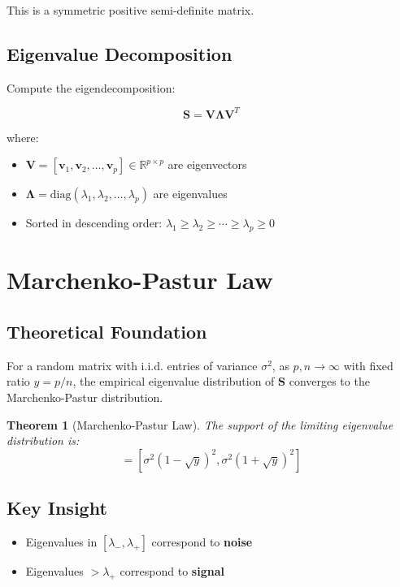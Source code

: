 \documentclass[12pt,a4paper]{article}
\newtheorem{theorem}{Theorem}
\begin{document}
This is a symmetric positive semi-definite matrix.

\subsection{Eigenvalue Decomposition}

Compute the eigendecomposition:

\begin{equation}
\mathbf{S} = \mathbf{V}\mathbf{\Lambda}\mathbf{V}^T
\end{equation}

where:
\begin{itemize}
    \item $\mathbf{V} = [\mathbf{v}_1, \mathbf{v}_2, \ldots, \mathbf{v}_p] \in \mathbb{R}^{p \times p}$ are eigenvectors
    \item $\mathbf{\Lambda} = \text{diag}(\lambda_1, \lambda_2, \ldots, \lambda_p)$ are eigenvalues
    \item Sorted in descending order: $\lambda_1 \geq \lambda_2 \geq \cdots \geq \lambda_p \geq 0$
\end{itemize}

\section{Marchenko-Pastur Law}

\subsection{Theoretical Foundation}

For a random matrix with i.i.d. entries of variance $\sigma^2$, as $p, n \to \infty$ with fixed ratio $y = p/n$, the empirical eigenvalue distribution of $\mathbf{S}$ converges to the Marchenko-Pastur distribution.

\begin{theorem}[Marchenko-Pastur Law]
The support of the limiting eigenvalue distribution is:
\begin{equation}
[\lambda_-, \lambda_+] = \left[\sigma^2(1-\sqrt{y})^2, \sigma^2(1+\sqrt{y})^2\right]
\end{equation}
\end{theorem}

\subsection{Key Insight}

\begin{itemize}
    \item Eigenvalues in $[\lambda_-, \lambda_+]$ correspond to \textbf{noise}
    \item Eigenvalues $> \lambda_+$ correspond to \textbf{signal}
\end{itemize}
\end{document}
